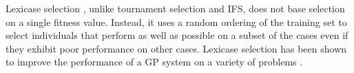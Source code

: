 \documentclass{sig-alternate}
\begin{document}
Lexicase selection \cite{Helmuth:2014:ieeeTEC, Spector:2012:APM:2330784.2330846}, %
 unlike tournament selection and IFS, does not base selection on a single fitness value. Instead, it uses a random ordering of the training set to select individuals that perform as well as possible on a subset of the cases even if they exhibit poor performance on other cases. Lexicase selection has been shown to improve the performance of a GP system on a variety of problems \cite{Helmuth:2014:ieeeTEC, Helmuth:2014:GECCO, Helmuth:2013:GECCOcomp}. %

\end{document}
